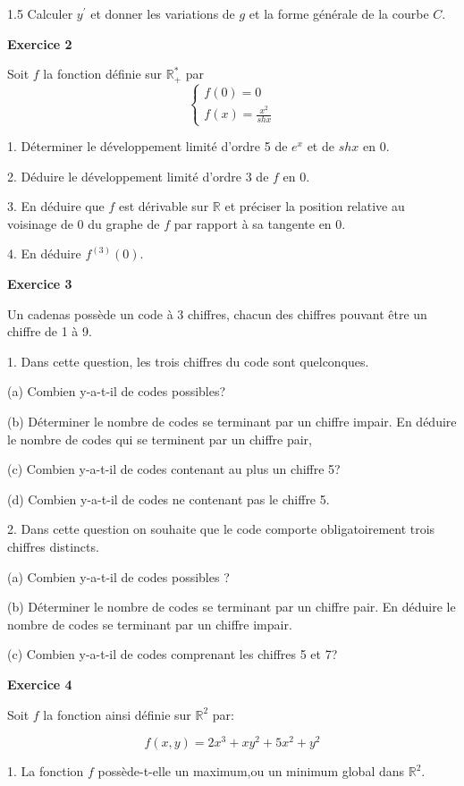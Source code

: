 \documentclass[12pt]{article}
\begin{document}
\begin{spacing}{1.5}
Calculer $y^\prime$ et donner les variations de $g$ et la forme générale de la courbe $C$.

\medskip\textbf{Exercice 2}

 Soit $f$ la fonction définie sur $\mathbb{R}_{+}^{*}$ par
 \[
 \begin{cases}
 f(0)=0\\
 f(x)= \frac{x^2}{sh x}
 \end{cases}
 \]
 
 1. Déterminer le développement limité d'ordre 5 de $e^x$ et de $sh x$ en 0.
 
 2. Déduire le développement limité d'ordre 3 de $f$ en 0.
 
 3. En déduire que $f$ est dérivable sur $\mathbb{R}$ et préciser la position relative au voisinage de 0 du graphe de $f$ par rapport à sa tangente en 0.
 
 4. En déduire $f^{(3)}(0)$.
 
 \medskip\textbf{Exercice 3}

 Un cadenas possède un code à 3 chiffres, chacun des chiffres pouvant être un chiffre de 1 à 9.
 
 1. Dans cette question, les trois chiffres du code sont quelconques.
 
 (a) Combien y-a-t-il de codes possibles?
 
 (b) Déterminer le nombre de codes se terminant par un chiffre impair. En déduire le nombre de codes qui se terminent par un chiffre pair,
 
 (c) Combien y-a-t-il de codes contenant au plus un chiffre 5?
 
 (d) Combien y-a-t-il de codes ne contenant pas le chiffre 5.
 
 2. Dans cette question on souhaite que le code comporte obligatoirement trois chiffres distincts.
 
 (a) Combien y-a-t-il de codes possibles ?
 
 (b) Déterminer le nombre de codes se terminant par un chiffre pair. En déduire le nombre de codes se terminant par un chiffre impair.
 
 (c) Combien y-a-t-il de codes comprenant les chiffres 5 et 7?
 
 \medskip\textbf{Exercice 4}

 Soit $f$ la fonction ainsi définie sur $\mathbb{R}^2$ par:
 
 \[f(x,y)=2x^3+xy^2+5x^2+y^2\]
 
 1. La fonction $f$ possède-t-elle un maximum,ou un minimum global dans $\mathbb{R}^2$.
 

\end{spacing}
\end{document}
